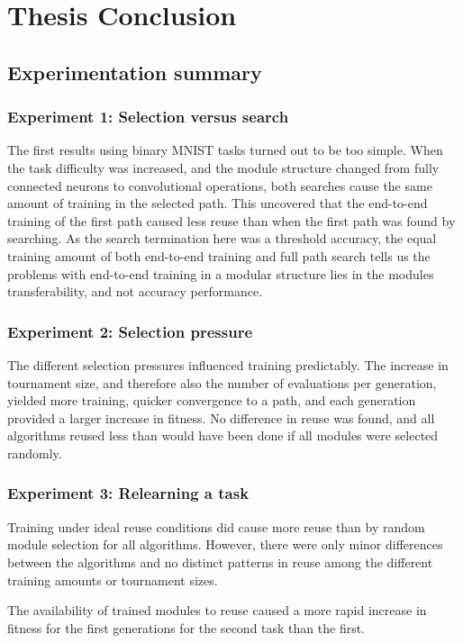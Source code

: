 \chapter{Thesis Conclusion}

\section{Experimentation summary}
\subsection{Experiment 1: Selection versus search}
The first results using binary MNIST tasks turned out to be too simple. When the task difficulty was increased, and the module structure changed from fully connected neurons to convolutional operations, both searches cause the same amount of training in the selected path. This uncovered that the end-to-end training of the first path caused less reuse than when the first path was found by searching. As the search termination here was a threshold accuracy, the equal training amount of both end-to-end training and full path search tells us the problems with end-to-end training in a modular structure lies in the modules transferability, and not accuracy performance.

\subsection{Experiment 2: Selection pressure}
The different selection pressures influenced training predictably. The increase in tournament size, and therefore also the number of evaluations per generation, yielded more training, quicker convergence to a path, and each generation provided a larger increase in fitness. No difference in reuse was found, and all algorithms reused less than would have been done if all modules were selected randomly. 

\subsection{Experiment 3: Relearning a task}
Training under ideal reuse conditions did cause more reuse than by random module selection for all algorithms. However, there were only minor differences between the algorithms and no distinct patterns in reuse among the different training amounts or tournament sizes. 

The availability of trained modules to reuse caused a more rapid increase in fitness for the first generations for the second task than the first.  

